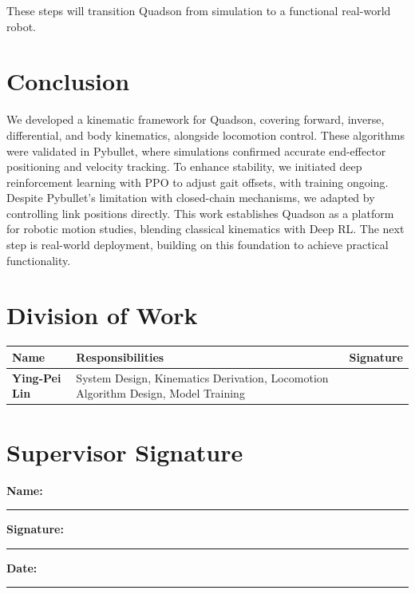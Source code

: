 \documentclass[a4paper,11pt]{article}
\begin{document}
These steps will transition Quadson from simulation to a functional real-world robot.

\section{Conclusion}

We developed a kinematic framework for Quadson, covering forward, inverse, differential, and body kinematics, alongside locomotion control. These algorithms were validated in Pybullet, where simulations confirmed accurate end-effector positioning and velocity tracking. 
To enhance stability, we initiated deep reinforcement learning with PPO to adjust gait offsets, with training ongoing. Despite Pybullet's limitation with closed-chain mechanisms, we adapted by controlling link positions directly. This work establishes Quadson as a platform for robotic motion studies, 
blending classical kinematics with Deep RL. The next step is real-world deployment, building on this foundation to achieve practical functionality.

\newpage
\section*{Division of Work}

\renewcommand{\arraystretch}{1.8}
\begin{table}[h!]
\centering
\begin{tabular}{|l|p{8cm}|p{3cm}|}
\hline
\textbf{Name} & \textbf{Responsibilities} & \textbf{Signature} \\ 
\hline
\textbf{Ying-Pei Lin} & System Design, Kinematics Derivation, Locomotion Algorithm Design, Model Training & \\
\hline
\end{tabular}
\end{table}

\section*{Supervisor Signature}
\vspace{1cm}

\noindent
\textbf{Name:} \rule{10cm}{0.4pt}

\vspace{1cm}

\noindent
\textbf{Signature:} \rule{10cm}{0.4pt}

\vspace{1cm}

\noindent
\textbf{Date:} \rule{10cm}{0.4pt}
\end{document}
